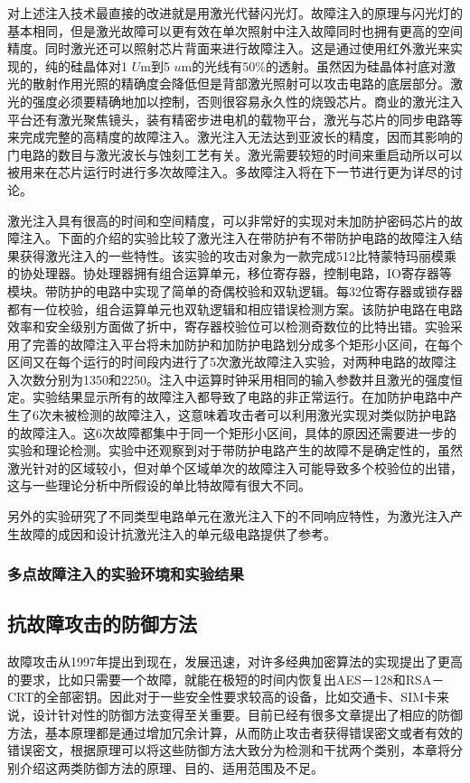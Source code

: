 \documentclass[a4paper,12pt]{article}
\begin{document}
\begin{CJK}{UTF8}{gkai}
对上述注入技术最直接的改进就是用激光代替闪光灯。故障注入的原理与闪光灯的基本相同，但是激光故障可以更有效在单次照射中注入故障同时也拥有更高的空间精度。同时激光还可以照射芯片背面来进行故障注入。这是通过使用红外激光来实现的，纯的硅晶体对1 $U$m到5 $u$m的光线有50\%的透射。虽然因为硅晶体衬底对激光的散射作用光照的精确度会降低但是背部激光照射可以攻击电路的底层部分。激光的强度必须要精确地加以控制，否则很容易永久性的烧毁芯片。商业的激光注入平台还有激光聚焦镜头，装有精密步进电机的载物平台，激光与芯片的同步电路等来完成完整的高精度的故障注入。激光注入无法达到亚波长的精度，因而其影响的门电路的数目与激光波长与蚀刻工艺有关。激光需要较短的时间来重启动所以可以被用来在芯片运行时进行多次故障注入。多故障注入将在下一节进行更为详尽的讨论。

激光注入具有很高的时间和空间精度，可以非常好的实现对未加防护密码芯片的故障注入。下面的介绍的实验比较了激光注入在带防护有不带防护电路的故障注入结果获得激光注入的一些特性。该实验的攻击对象为一款完成512比特蒙特玛丽模乘的协处理器。协处理器拥有组合运算单元，移位寄存器，控制电路，IO寄存器等模块。带防护的电路中实现了简单的奇偶校验和双轨逻辑。每32位寄存器或锁存器都有一位校验，组合运算单元也双轨逻辑和相应错误检测方案。该防护电路在电路效率和安全级别方面做了折中，寄存器校验位可以检测奇数位的比特出错。实验采用了完善的故障注入平台将未加防护和加防护电路划分成多个矩形小区间，在每个区间又在每个运行的时间段内进行了5次激光故障注入实验，对两种电路的故障注入次数分别为1350和2250。注入中运算时钟采用相同的输入参数并且激光的强度恒定。实验结果显示所有的故障注入都导致了电路的非正常运行。在加防护电路中产生了6次未被检测的故障注入，这意味着攻击者可以利用激光实现对类似防护电路的故障注入。这6次故障都集中于同一个矩形小区间，具体的原因还需要进一步的实验和理论检测。实验中还观察到对于带防护电路产生的故障不是确定性的，虽然激光针对的区域较小，但对单个区域单次的故障注入可能导致多个校验位的出错，这与一些理论分析中所假设的单比特故障有很大不同。

另外的实验研究了不同类型电路单元在激光注入下的不同响应特性，为激光注入产生故障的成因和设计抗激光注入的单元级电路提供了参考。
\subsubsection{多点故障注入的实验环境和实验结果}
\subsection{抗故障攻击的防御方法}
故障攻击从1997年提出到现在，发展迅速，对许多经典加密算法的实现提出了更高的要求，比如只需要一个故障，就能在极短的时间内恢复出AES－128和RSA－CRT的全部密钥。因此对于一些安全性要求较高的设备，比如交通卡、SIM卡来说，设计针对性的防御方法变得至关重要。目前已经有很多文章提出了相应的防御方法，基本原理都是通过增加冗余计算，从而防止攻击者获得错误密文或者有效的错误密文，根据原理可以将这些防御方法大致分为检测和干扰两个类别，本章将分别介绍这两类防御方法的原理、目的、适用范围及不足。

\end{CJK}
\end{document}
